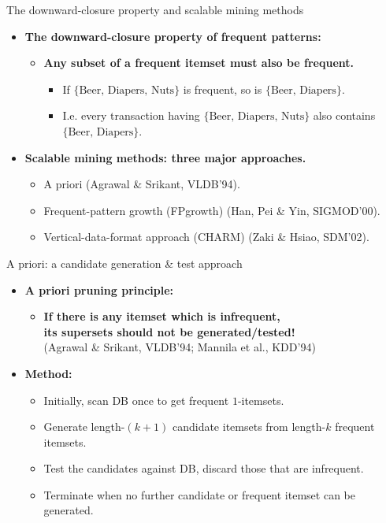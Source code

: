 \documentclass[aspectratio=169,t]{beamer}
\begin{document}
  {
    \begin{frame}{The downward-closure property and scalable mining methods}
    \begin{itemize}
      \item \textbf{The downward-closure property of frequent patterns:}
      \begin{itemize}
        \item \textbf{\color{airforceblue}Any subset of a frequent itemset must also be frequent.}
        \begin{itemize}
          \item If $\{\text{Beer, Diapers, Nuts}\}$ is frequent, so is $\{\text{Beer, Diapers}\}$.
          \item I.e. every transaction having $\{\text{Beer, Diapers, Nuts}\}$ also contains $\{\text{Beer, Diapers}\}$.
        \end{itemize}
      \end{itemize}
      \item \textbf{Scalable mining methods: three major approaches.}
      \begin{itemize}
        \item A priori (Agrawal \& Srikant, VLDB'94).
        \item Frequent-pattern growth (FPgrowth) (Han, Pei \& Yin, SIGMOD'00).
        \item Vertical-data-format approach (CHARM) (Zaki \& Hsiao, SDM'02).
      \end{itemize}
    \end{itemize}
    \end{frame}
  }

  {
    \begin{frame}{A priori: a candidate generation \& test approach}
    \begin{itemize}
      \item \textbf{A priori pruning principle:}
      \begin{itemize}
        \item \textbf{\color{airforceblue}If there is any itemset which is infrequent, \\ its supersets should not be generated/tested!} \\ (Agrawal \& Srikant, VLDB'94; Mannila et al., KDD'94)
      \end{itemize}
      \item \textbf{Method:}
      \begin{itemize}
        \item Initially, scan DB once to get frequent $1$-itemsets.
        \item Generate length-$(k+1)$ candidate itemsets from length-$k$ frequent itemsets.
        \item Test the candidates against DB, discard those that are infrequent.
        \item Terminate when no further candidate or frequent itemset can be generated.
      \end{itemize}
    \end{itemize}
    \end{frame}
  }
\end{document}
